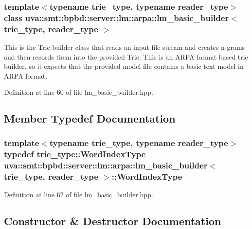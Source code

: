 \subsubsection*{template$<$typename trie\+\_\+type, typename reader\+\_\+type$>$class uva\+::smt\+::bpbd\+::server\+::lm\+::arpa\+::lm\+\_\+basic\+\_\+builder$<$ trie\+\_\+type, reader\+\_\+type $>$}

This is the Trie builder class that reads an input file stream and creates n-\/grams and then records them into the provided Trie. This is an A\+R\+P\+A format based trie builder, so it expects that the provided model file contains a basic text model in A\+R\+P\+A format. 

Definition at line 60 of file lm\+\_\+basic\+\_\+builder.\+hpp.



\subsection{Member Typedef Documentation}
\hypertarget{classuva_1_1smt_1_1bpbd_1_1server_1_1lm_1_1arpa_1_1lm__basic__builder_a8011babc7fa7b15bf2499306a0c3e6e9}{}
\subsubsection[{Word\+Index\+Type}]{\setlength{\rightskip}{0pt plus 5cm}template$<$typename trie\+\_\+type, typename reader\+\_\+type$>$ typedef trie\+\_\+type\+::\+Word\+Index\+Type {\bf uva\+::smt\+::bpbd\+::server\+::lm\+::arpa\+::lm\+\_\+basic\+\_\+builder}$<$ trie\+\_\+type, reader\+\_\+type $>$\+::{\bf Word\+Index\+Type}}\label{classuva_1_1smt_1_1bpbd_1_1server_1_1lm_1_1arpa_1_1lm__basic__builder_a8011babc7fa7b15bf2499306a0c3e6e9}


Definition at line 62 of file lm\+\_\+basic\+\_\+builder.\+hpp.



\subsection{Constructor \& Destructor Documentation}
\hypertarget{classuva_1_1smt_1_1bpbd_1_1server_1_1lm_1_1arpa_1_1lm__basic__builder_a9355c092a6a91c991de8fa5e2589de01}{}
